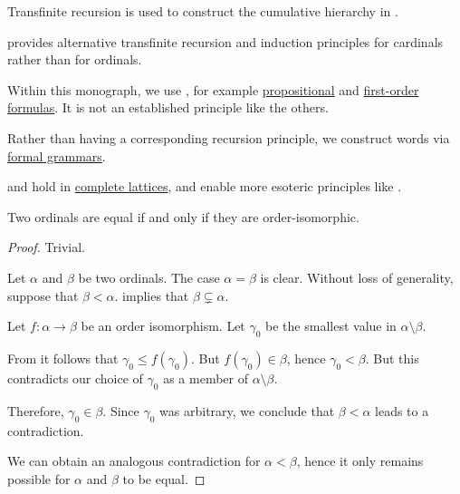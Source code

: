 \begin{concept}
\begin{thmenum}
    Transfinite recursion is used to construct the cumulative hierarchy in .

     provides alternative transfinite recursion and induction principles for cardinals rather than for ordinals.

     Within this monograph, we use , for example \hyperref[def:propositional_syntax/formula]{propositional} and \hyperref[def:first_order_syntax/formula]{first-order formulas}. It is not an established principle like the others.

    Rather than having a corresponding recursion principle, we construct words via \hyperref[def:formal_grammar]{formal grammars}.

      and  hold in \hyperref[def:complete_lattice]{complete lattices}, and enable more esoteric principles like .
  \end{thmenum}
\end{concept}

\begin{proposition}\label{thm:ordinal_isomorphism}
  Two ordinals are equal if and only if they are order-isomorphic.
\end{proposition}
\begin{proof}
  \SufficiencySubProof Trivial.

  \NecessitySubProof Let \( \alpha \) and \( \beta \) be two ordinals. The case \( \alpha = \beta \) is clear. Without loss of generality, suppose that \( \beta < \alpha \).  implies that \( \beta \subsetneq \alpha \).

  Let \( f: \alpha \to \beta \) be an order isomorphism. Let \( \gamma_0 \) be the smallest value in \( \alpha \setminus \beta \).

  From  it follows that \( \gamma_0 \leq f(\gamma_0) \). But \( f(\gamma_0) \in \beta \), hence \( \gamma_0 < \beta \). But this contradicts our choice of \( \gamma_0 \) as a member of \( \alpha \setminus \beta \).

  Therefore, \( \gamma_0 \in \beta \). Since \( \gamma_0 \) was arbitrary, we conclude that \( \beta < \alpha \) leads to a contradiction.

  We can obtain an analogous contradiction for \( \alpha < \beta \), hence it only remains possible for \( \alpha \) and \( \beta \) to be equal.
\end{proof}


